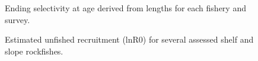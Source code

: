 \documentclass[
]{scrartcl}
\begin{document}
\begin{figure}[H]


\caption{\label{fig-sel-all-age}Ending selectivity at age derived from
lengths for each fishery and survey.}

\end{figure}%

\begin{figure}[H]


\caption{\label{fig-lnR0}Estimated unfished recruitment (lnR0) for
several assessed shelf and slope rockfishes.}

\end{figure}%
\end{document}
